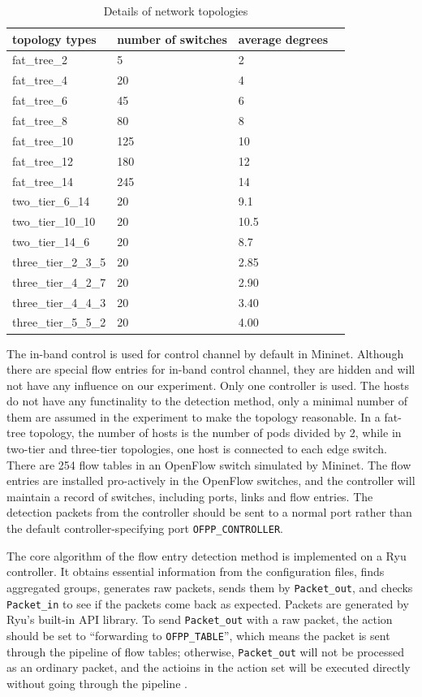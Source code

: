 \begin{table}[H]
\centering
\caption{Details of network topologies}
\begin{tabular}{|l|l|l|l|}
\hline topology types & number of switches & average degrees \\
\hline
\hline fat\_tree\_2 & 5 & 2 \\
\hline fat\_tree\_4 & 20 & 4 \\
\hline fat\_tree\_6 & 45 & 6 \\
\hline fat\_tree\_8 & 80 & 8 \\
\hline fat\_tree\_10 & 125 & 10 \\
\hline fat\_tree\_12 & 180 & 12 \\
\hline fat\_tree\_14 & 245 & 14 \\
\hline two\_tier\_6\_14 & 20 & 9.1 \\
\hline two\_tier\_10\_10 & 20 & 10.5 \\
\hline two\_tier\_14\_6 & 20 & 8.7 \\
\hline three\_tier\_2\_3\_5 & 20 & 2.85 \\
\hline three\_tier\_4\_2\_7 & 20 & 2.90 \\
\hline three\_tier\_4\_4\_3 & 20 & 3.40 \\
\hline three\_tier\_5\_5\_2 & 20 & 4.00 \\
\hline 
\end{tabular}
\label{table:network_env}
\end{table}

The in-band control is used for control channel by default in Mininet. Although there are special flow entries for in-band control channel, they are hidden and will not have any influence on our experiment. Only one controller is used. The hosts do not have any functinality to the detection method, only a minimal number of them are assumed in the experiment to make the topology reasonable. In a fat-tree topology, the number of hosts is the number of pods divided by 2, while in two-tier and three-tier topologies, one host is connected to each edge switch. There are 254 flow tables in an OpenFlow switch simulated by Mininet. The flow entries are installed pro-actively in the OpenFlow switches, and the controller will maintain a record of switches, including ports, links and flow entries. The detection packets from the controller should be sent to a normal port rather than the default controller-specifying port \texttt{OFPP\_CONTROLLER}.

The core algorithm of the flow entry detection method is implemented on a Ryu controller. It obtains essential information from the configuration files, finds aggregated groups, generates raw packets, sends them by \texttt{Packet\_out}, and checks \texttt{Packet\_in} to see if the packets come back as expected. Packets are generated by Ryu's built-in API library. To send \texttt{Packet\_out} with a raw packet, the action should be set to ``forwarding to \texttt{OFPP\_TABLE}'', which means the packet is sent through the pipeline of flow tables; otherwise, \texttt{Packet\_out} will not be processed as an ordinary packet, and the actioins in the action set will be executed directly without going through the pipeline \cite{PACKETOUT}. 

